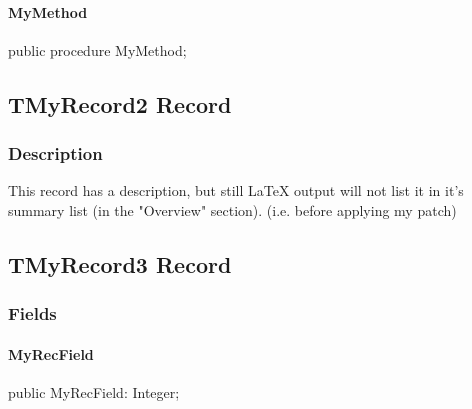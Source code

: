 \documentclass{report}
\begin{document}
\paragraph*{MyMethod}\hspace*{\fill}

\begin{list}{}{
\setlength{\itemindent}{0cm}
\setlength{\listparindent}{0cm}
\setlength{\leftmargin}{\evensidemargin}
\addtolength{\leftmargin}{\tmplength}
\settowidth{\labelsep}{X}
\addtolength{\leftmargin}{\labelsep}
\setlength{\labelwidth}{\tmplength}
}
\begin{flushleft}
\item[\textbf{Declaration}\hfill]
\begin{ttfamily}
public procedure MyMethod;\end{ttfamily}


\end{flushleft}
\end{list}
\subsection*{TMyRecord2 Record}
\subsubsection*{\large{\textbf{Description}}\normalsize\hspace{1ex}\hfill}
This record has a description, but still LaTeX output will not list it in it's summary list (in the "Overview" section). (i.e. before applying my patch)\subsection*{TMyRecord3 Record}
\subsubsection*{\large{\textbf{Fields}}\normalsize\hspace{1ex}\hfill}
\paragraph*{MyRecField}\hspace*{\fill}

\begin{list}{}{
\setlength{\itemindent}{0cm}
\setlength{\listparindent}{0cm}
\setlength{\leftmargin}{\evensidemargin}
\addtolength{\leftmargin}{\tmplength}
\settowidth{\labelsep}{X}
\addtolength{\leftmargin}{\labelsep}
\setlength{\labelwidth}{\tmplength}
}
\begin{flushleft}
\item[\textbf{Declaration}\hfill]
\begin{ttfamily}
public MyRecField: Integer;\end{ttfamily}


\end{flushleft}
\end{list}
\end{document}
